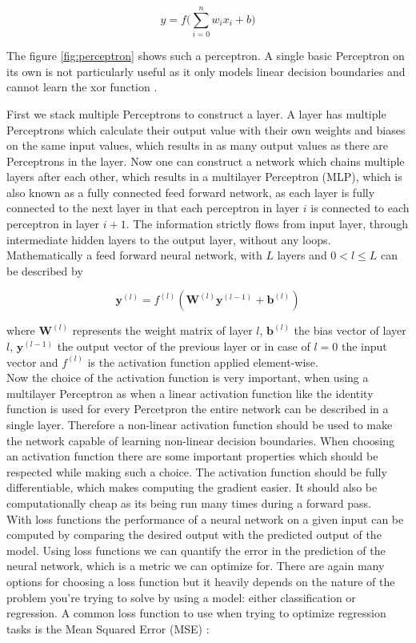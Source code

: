 \documentclass[twoside,a4paper,10pt,DIV=12,BCOR=12mm]{scrartcl}
\begin{document}
$$
y=f\bigl(\sum_{i=0}^{n}w_i x_i + b\bigr)
$$


The figure \ref{fig:perceptron} shows such a perceptron.
A single basic Perceptron on its own is not particularly useful as
it only models linear decision boundaries and cannot learn the xor function \cite{MinskyPapert69}.

First we stack multiple Perceptrons to construct a layer. A layer has multiple
Perceptrons which calculate their output value with their own weights and biases on the same input values, which results
in as many output values as there are Perceptrons in the layer. Now one can construct a network which chains
multiple layers after each other, which results in a multilayer Perceptron (MLP), which is also known as a fully connected
feed forward network, as each layer is fully connected to the next layer in that each perceptron in layer $i$ 
is connected to each perceptron in layer $i+1$. The information strictly flows from input layer, through
intermediate hidden layers to the output layer, without any loops.
Mathematically a feed forward neural network, with $L$ layers and $0 < l \leq L$ can be described by

$$\mathbf{y}^{(l)} = f^{(l)}(\mathbf{W}^{(l)}\mathbf{y}^{(l-1)}+\mathbf{b}^{(l)})$$

where $\mathbf{W}^{(l)}$ represents the weight matrix of layer $l$, $\mathbf{b}^{(l)}$ the bias vector of layer $l$,
$\mathbf{y}^{(l-1)}$ the output vector of the previous layer or in case of $l=0$ the input vector
and $f^{(l)}$ is the activation function applied element-wise. \\


Now the choice of the activation function is very important, when using a multilayer Perceptron as when a linear activation function like the 
identity function is used for every Percetpron the entire network can be described in a single layer. Therefore
a non-linear activation function should be used to make the network capable of learning non-linear
decision boundaries. When choosing an activation function there are some important
properties which should be respected while making such a choice. The activation function should be fully differentiable, which makes
computing the gradient easier. It should also be computationally
cheap as its being run many times during a forward pass. \\

With loss functions the performance of a neural network on a given input can be computed by comparing the desired output with the 
predicted output of the model. Using loss functions we can quantify the error in the prediction of the neural network, which 
is a metric we can optimize for. There are again many options for choosing a loss function but it heavily depends on the nature of the
problem you're trying to solve by using a model: either classification or regression. A common loss function to use when trying to optimize 
regression tasks is the Mean Squared Error (MSE) \cite{Goodfellow16}:
\end{document}
